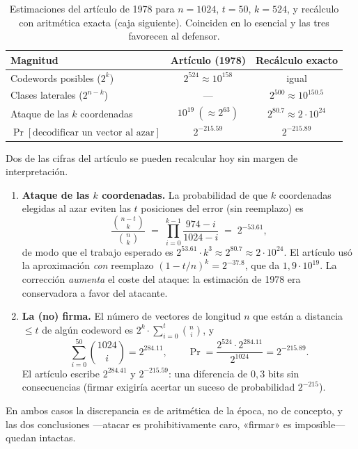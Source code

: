 \documentclass[11pt,a4paper,oneside]{report}
\begin{document}
\begin{table}[htbp]
\centering
\small
\begin{tabular}{lcc}
\toprule
Magnitud & Artículo (1978) & Recálculo exacto\\
\midrule
Codewords posibles ($2^k$) & $2^{524}\approx10^{158}$ & igual\\
Clases laterales ($2^{n-k}$) & --- & $2^{500}\approx10^{150.5}$\\
Ataque de las $k$ coordenadas & $10^{19}\ (\approx2^{63})$ & $2^{80.7}\approx2\cdot10^{24}$\\
$\Pr[\text{decodificar un vector al azar}]$ & $2^{-215.59}$ & $2^{-215.89}$\\
\bottomrule
\end{tabular}
\caption{Estimaciones del artículo de 1978 para $n=1024$, $t=50$,
$k=524$, y recálculo con aritmética exacta (caja siguiente). Coinciden
en lo esencial y las tres favorecen al defensor.}
\label{tab:1978-numeros}
\end{table}

\begin{rigor}
Dos de las cifras del artículo se pueden recalcular hoy sin margen de
interpretación.
\begin{enumerate}[label=(\arabic*),leftmargin=1.8em,itemsep=3pt]
  \item \textbf{Ataque de las $k$ coordenadas.} La probabilidad de
        que $k$ coordenadas elegidas al azar eviten las $t$ posiciones
        del error (sin reemplazo) es
        \[
          \frac{\binom{n-t}{k}}{\binom{n}{k}}
          \;=\;\prod_{i=0}^{k-1}\frac{974-i}{1024-i}
          \;=\;2^{-53.61},
        \]
        de modo que el trabajo esperado es
        $2^{53.61}\cdot k^{3}\approx 2^{80.7}\approx 2\cdot10^{24}$.
        El artículo usó la aproximación \emph{con} reemplazo
        $(1-t/n)^k=2^{-37.8}$, que da $1{,}9\cdot10^{19}$. La
        corrección \emph{aumenta} el coste del ataque: la estimación
        de 1978 era conservadora a favor del atacante.
  \item \textbf{La (no) firma.} El número de vectores de longitud $n$
        que están a distancia $\le t$ de algún codeword es
        $2^{k}\cdot\sum_{i=0}^{t}\binom{n}{i}$, y
        \[
          \sum_{i=0}^{50}\binom{1024}{i}=2^{284.11},
          \qquad
          \Pr=\frac{2^{524}\cdot2^{284.11}}{2^{1024}}=2^{-215.89}.
        \]
        El artículo escribe $2^{284.41}$ y $2^{-215.59}$: una
        diferencia de $0{,}3$ bits sin consecuencias (firmar exigiría
        acertar un suceso de probabilidad $2^{-215}$).
\end{enumerate}
En ambos casos la discrepancia es de aritmética de la época, no de
concepto, y las dos conclusiones —atacar es prohibitivamente caro,
«firmar» es imposible— quedan intactas.
\end{rigor}
\end{document}
